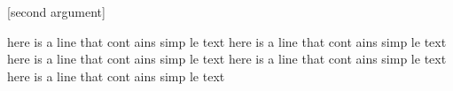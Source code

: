 [second argument]

\begin{myenv}
here
is a
line
that
cont
ains
simp
le
text
here
is a
line
that
cont
ains
simp
le
text
here
is a
line
that
cont
ains
simp
le
text
here
is a
line
that
cont
ains
simp
le
text
here
is a
line
that
cont
ains
simp
le
text
\end{myenv}
